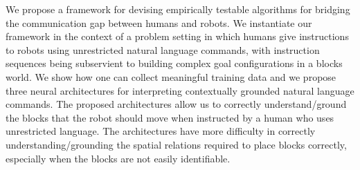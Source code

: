 We propose a framework for devising empirically testable algorithms for bridging the communication gap between humans and robots. We instantiate our framework in the context of a problem setting in which humans give instructions to robots using unrestricted natural language commands, with instruction sequences being subservient to building complex goal configurations in a blocks world. We show how one can collect meaningful training data and we propose three neural architectures for interpreting contextually grounded natural language commands. The proposed architectures allow us to correctly understand/ground the blocks that the robot should move when instructed by a human who uses unrestricted language. The architectures have more difficulty in correctly understanding/grounding the spatial relations required to place blocks correctly, especially when the blocks are not easily identifiable.
